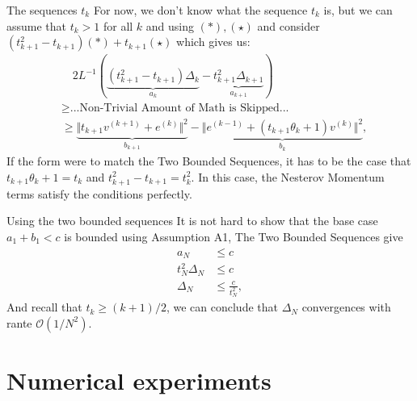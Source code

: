 \documentclass[11pt]{beamer}
\begin{document}
        \begin{frame}{The sequences $t_k$}
            For now, we don't know what the sequence $t_k$ is, but we can assume that $t_k > 1$ for all $k$ and using $(*), (\star)$ and consider $(t_{k + 1}^2- t_{k + 1})(*) + t_{k + 1}(\star)$ which gives us: 
            {\scriptsize
                \begin{align*}
                    & \quad 2L^{-1}(
                        \underbrace{(t_{k + 1}^2 - t_{k + 1})
                        \Delta_k}_{a_k}
                        - 
                        \underbrace{t_{k + 1}^2\Delta_{k + 1}}_{a_{k + 1}}
                    )
                    \\
                    & \ge \text{...Non-Trivial Amount of Math is Skipped...}
                    \\
                    & \ge  
                    \underbrace{\Vert t_{k + 1}v^{(k + 1)} + e^{(k)}\Vert^2}_{b_{k + 1}}
                    - 
                    \underbrace{\Vert e^{(k - 1)} + (t_{k + 1}\theta_k + 1) v^{(k)} \Vert^2}_{b_k},
                    \tag{$\star \star$}
                \end{align*}
                }
                If the form were to match the Two Bounded Sequences, it has to be the case that $t_{k + 1}\theta_k + 1 = t_{k}$ and $t^2_{k + 1} - t_{k + 1} = t_k^2$. In this case, the Nesterov Momentum terms satisfy the conditions perfectly. 
        \end{frame}
        \begin{frame}{Using the two bounded sequences}
            It is not hard to show that the base case $a_1 + b_1 < c$ is bounded using Assumption A1, The Two Bounded Sequences give
            \begin{align}
                a_N &\le c
                \\
                t_N^2\Delta_N &\le c
                \\
                \Delta_N &\le \frac{c}{t_N^2}, 
            \end{align}
            And recall that $t_k \ge (k + 1)/2$, we can conclude that $\Delta_N$ convergences with rante $\mathcal O (1/N^2)$. 
        \end{frame}
    
\section{Numerical experiments}
\end{document}
